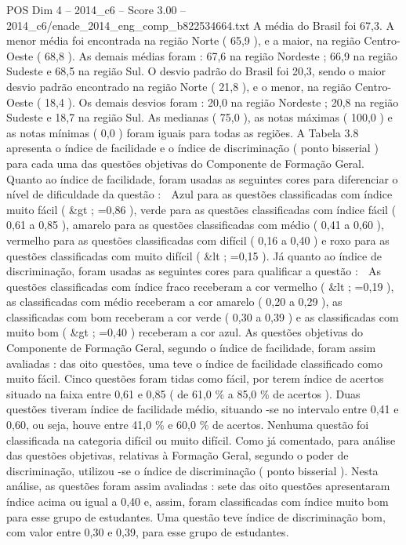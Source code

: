 \begin{textsample}{POS Dim 4 – 2014\_c6 – Score 3.00 – 2014\_c6/enade\_2014\_eng\_comp\_b822534664.txt}
A média do Brasil foi 67,3.
A menor média foi encontrada na região Norte ( 65,9 ), e a maior, na região Centro-Oeste ( 68,8 ).
As demais médias foram : 67,6 na região Nordeste ; 66,9 na região Sudeste e 68,5 na região Sul.
O desvio padrão do Brasil foi 20,3, sendo o maior desvio padrão encontrado na região Norte ( 21,8 ), e o menor, na região Centro-Oeste ( 18,4 ).
Os demais desvios foram : 20,0 na região Nordeste ; 20,8 na região Sudeste e 18,7 na região Sul.
As medianas ( 75,0 ), as notas máximas ( 100,0 ) e as notas mínimas ( 0,0 ) foram iguais para todas as regiões.
A Tabela 3.8 apresenta o índice de facilidade e o índice de discriminação ( ponto bisserial ) para cada uma das questões objetivas do Componente de Formação Geral.
Quanto ao índice de facilidade, foram usadas as seguintes cores para diferenciar o nível de dificuldade da questão :  Azul para as questões classificadas com índice muito fácil ( \&gt ; =0,86 ), verde para as questões classificadas com índice fácil ( 0,61 a 0,85 ), amarelo para as questões classificadas com médio ( 0,41 a 0,60 ), vermelho para as questões classificadas com difícil ( 0,16 a 0,40 ) e roxo para as questões classificadas com muito difícil ( \&lt ; =0,15 ).
Já quanto ao índice de discriminação, foram usadas as seguintes cores para qualificar a questão :  As questões classificadas com índice fraco receberam a cor vermelho ( \&lt ; =0,19 ), as classificadas com médio receberam a cor amarelo ( 0,20 a 0,29 ), as classificadas com bom receberam a cor verde ( 0,30 a 0,39 ) e as classificadas com muito bom ( \&gt ; =0,40 ) receberam a cor azul.
As questões objetivas do Componente de Formação Geral, segundo o índice de facilidade, foram assim avaliadas : das oito questões, uma teve o índice de facilidade classificado como muito fácil.
Cinco questões foram tidas como fácil, por terem índice de acertos situado na faixa entre 0,61 e 0,85 ( de 61,0 \% a 85,0 \% de acertos ).
Duas questões tiveram índice de facilidade médio, situando -se no intervalo entre 0,41 e 0,60, ou seja, houve entre 41,0 \% e 60,0 \% de acertos.
Nenhuma questão foi classificada na categoria difícil ou muito difícil.
Como já comentado, para análise das questões objetivas, relativas à Formação Geral, segundo o poder de discriminação, utilizou -se o índice de discriminação ( ponto bisserial ).
Nesta análise, as questões foram assim avaliadas : sete das oito questões apresentaram índice acima ou igual a 0,40 e, assim, foram classificadas com índice muito bom para esse grupo de estudantes.
Uma questão teve índice de discriminação bom, com valor entre 0,30 e 0,39, para esse grupo de estudantes.

\end{textsample}
